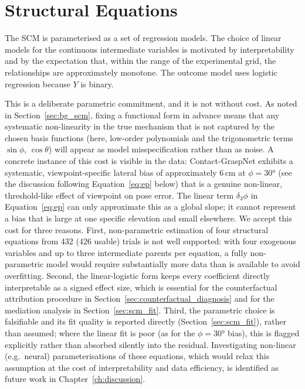 \documentclass[11pt,a4paper]{report}
\begin{document}
\section{Structural Equations}
\label{sec:structural_equations}

The SCM is parameterised as a set of regression models. The choice of linear models for the continuous intermediate variables is motivated by interpretability and by the expectation that, within the range of the experimental grid, the relationships are approximately monotone. The outcome model uses logistic regression because $Y$ is binary.

This is a deliberate parametric commitment, and it is not without cost. As noted in Section~\ref{sec:bg_scm}, fixing a functional form in advance means that any systematic non-linearity in the true mechanism that is not captured by the chosen basis functions (here, low-order polynomials and the trigonometric terms $\sin\phi$, $\cos\theta$) will appear as model misspecification rather than as noise. A concrete instance of this cost is visible in the data: Contact-GraspNet exhibits a systematic, viewpoint-specific lateral bias of approximately 6\,cm at $\phi = 30°$ (see the discussion following Equation~\eqref{eq:ep} below) that is a genuine non-linear, threshold-like effect of viewpoint on pose error. The linear term $\delta_3 \phi$ in Equation~\eqref{eq:ep} can only approximate this as a global slope; it cannot represent a bias that is large at one specific elevation and small elsewhere. We accept this cost for three reasons. First, non-parametric estimation of four structural equations from 432 (426 usable) trials is not well supported: with four exogenous variables and up to three intermediate parents per equation, a fully non-parametric model would require substantially more data than is available to avoid overfitting. Second, the linear-logistic form keeps every coefficient directly interpretable as a signed effect size, which is essential for the counterfactual attribution procedure in Section~\ref{sec:counterfactual_diagnosis} and for the mediation analysis in Section~\ref{sec:scm_fit}. Third, the parametric choice is falsifiable and its fit quality is reported directly (Section~\ref{sec:scm_fit}), rather than assumed; where the linear fit is poor (as for the $\phi = 30°$ bias), this is flagged explicitly rather than absorbed silently into the residual. Investigating non-linear (e.g.\ neural) parameterisations of these equations, which would relax this assumption at the cost of interpretability and data efficiency, is identified as future work in Chapter~\ref{ch:discussion}.
\end{document}
